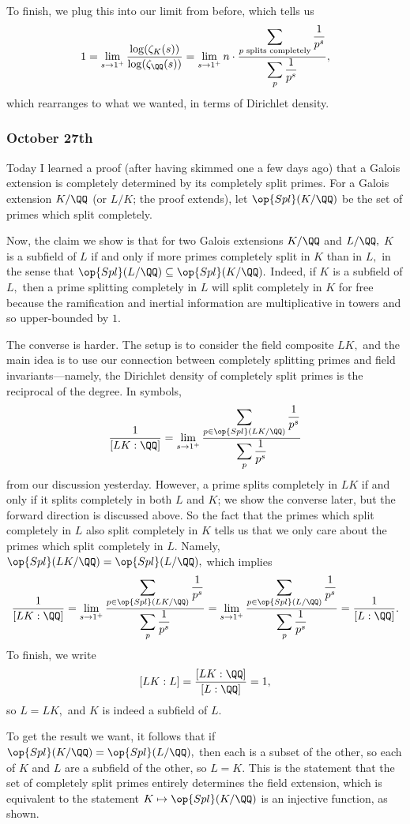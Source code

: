 To finish, we plug this into our limit from before, which tells us
\[1=\lim_{s\to1^+}\frac{\log(\zeta_K(s))}{\log(\zeta_\QQ(s))}=\lim_{s\to1^+}n\cdot\dfrac{\displaystyle\sum_{p\text{ splits completely}}\frac1{p^s}}{\displaystyle\sum_p\frac1{p^s}},\]
which rearranges to what we wanted, in terms of Dirichlet density.

\subsubsection{October 27th}
Today I learned a proof (after having skimmed one a few days ago) that a Galois extension is completely determined by its completely split primes. For a Galois extension $K/\QQ$ (or $L/K$; the proof extends), let $\op{Spl}(K/\QQ)$ be the set of primes which split completely. 

Now, the claim we show is that for two Galois extensions $K/\QQ$ and $L/\QQ,$ $K$ is a subfield of $L$ if and only if more primes completely split in $K$ than in $L,$ in the sense that $\op{Spl}(L/\QQ)\subseteq\op{Spl}(K/\QQ).$ Indeed, if $K$ is a subfield of $L,$ then a prime splitting completely in $L$ will split completely in $K$ for free because the ramification and inertial information are multiplicative in towers and so upper-bounded by $1.$

The converse is harder. The setup is to consider the field composite $LK,$ and the main idea is to use our connection between completely splitting primes and field invariants---namely, the Dirichlet density of completely split primes is the reciprocal of the degree. In symbols,
\[\frac1{[LK:\QQ]}=\lim_{s\to1^+}\dfrac{\displaystyle\sum_{p\in\op{Spl}(LK/\QQ)}\frac1{p^s}}{\displaystyle\sum_p\frac1{p^s}}\]
from our discussion yesterday. However, a prime splits completely in $LK$ if and only if it splits completely in both $L$ and $K$; we show the converse later, but the forward direction is discussed above. So the fact that the primes which split completely in $L$ also split completely in $K$ tells us that we only care about the primes which split completely in $L.$ Namely, $\op{Spl}(LK/\QQ)=\op{Spl}(L/\QQ),$ which implies
\[\frac1{[LK:\QQ]}=\lim_{s\to1^+}\dfrac{\displaystyle\sum_{p\in\op{Spl}(LK/\QQ)}\frac1{p^s}}{\displaystyle\sum_p\frac1{p^s}}=\lim_{s\to1^+}\dfrac{\displaystyle\sum_{p\in\op{Spl}(L/\QQ)}\frac1{p^s}}{\displaystyle\sum_p\frac1{p^s}}=\frac1{[L:\QQ]}.\]
To finish, we write
\[[LK:L]=\frac{[LK:\QQ]}{[L:\QQ]}=1,\]
so $L=LK,$ and $K$ is indeed a subfield of $L.$

To get the result we want, it follows that if $\op{Spl}(K/\QQ)=\op{Spl}(L/\QQ),$ then each is a subset of the other, so each of $K$ and $L$ are a subfield of the other, so $L=K.$ This is the statement that the set of completely split primes entirely determines the field extension, which is equivalent to the statement $K\mapsto\op{Spl}(K/\QQ)$ is an injective function, as shown.

